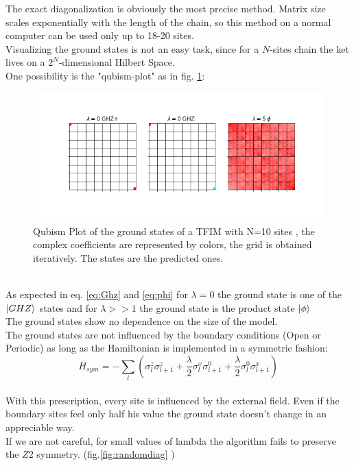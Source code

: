 \documentclass[12pt,a4paper]{article}
\begin{document}
The exact diagonalization is obviously the most precise method. Matrix size scales exponentially with the length of the chain, so this method on a normal computer can be used only up to 18-20 sites.\\
Visualizing the ground states is not an easy task, since for a $N$-sites chain the ket lives on a $2^N$-dimensional Hilbert Space. \\
One possibility is the "qubism-plot" \cite{Rodr_guez_Laguna_2012} as in fig. \ref{fig:lambdas}:
\begin{figure}[h]
	\centering
	\includegraphics[width=\linewidth]{degenerategrounds}
	\caption{Qubism Plot of the ground states of a TFIM with N=10 sites , the complex coefficients are represented by colors, the grid is obtained iteratively. The states are the predicted ones.}
	\label{fig:lambdas}
\end{figure}\\
As expected in eq. \ref{eq:Ghz} and \ref{eq:phi}  for $\lambda=0$ the ground state is one of the $\ket{GHZ}$ states  and for $\lambda>>1$ the ground state is the product state $\ket{\phi}$ \\
The ground states show no dependence on the size of the model. \\
The ground states are not influenced by the boundary conditions (Open or Periodic) as long as the Hamiltonian is implemented in a symmetric fashion:
\begin{equation}
	H_{sym}=-\sum_{l}\left(\sigma_{l}^{z} \sigma_{l+1}^{z}+\frac{\lambda}{2}\sigma_{l}^{x}\sigma_{l+1}^{0}+\frac{\lambda}{2}\sigma_{l}^{0}\sigma_{l+1}^{x}\right)	
\end{equation}\\
With this prescription, every site is influenced by the external field. Even if the boundary sites feel only half his value the ground state doesn't change in an appreciable way.\\
If we are not careful, for small values of lambda the algorithm fails to preserve the $Z2$ symmetry. (fig.\ref{fig:randomdiag} )\\ 
\end{document}
